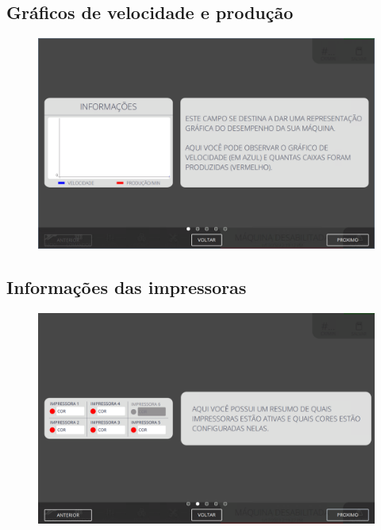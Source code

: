 \subsection{\small{Gráficos de velocidade e produção}}

\begin{figure}
    \centering
    \includegraphics[width=576 px,height=360 px]{src/imagesICV/01-main/2.png}
\end{figure}

\newpage
\thispagestyle{fancy}
\vspace{\fill}

\subsection{\small{Informações das impressoras}}

\begin{figure}
    \centering
    \includegraphics[width=576 px,height=360 px]{src/imagesICV/01-main/3.png}
\end{figure}

